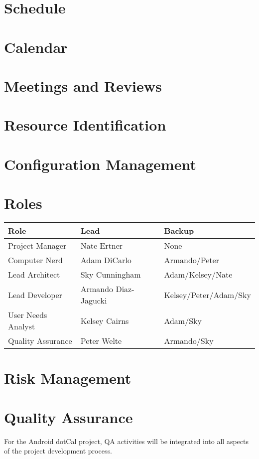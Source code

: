 \documentclass[11pt]{article}
\begin{document}
\section{Schedule}
\section{Calendar}
\section{Meetings and Reviews}
\section{Resource Identification}
\section{Configuration Management}
\section{Roles}

\begin{tabular}{|l|l|l|}
 \hline
\textbf{Role} & \textbf{Lead} & \textbf{Backup}  \\ \hline
Project Manager & Nate Ertner & None\\ \hline
Computer Nerd & Adam DiCarlo  & Armando/Peter\\ \hline
Lead Architect & Sky Cunningham  & Adam/Kelsey/Nate \\ \hline
Lead Developer & Armando Diaz-Jagucki & Kelsey/Peter/Adam/Sky \\ \hline
User Needs Analyst & Kelsey Cairns & Adam/Sky \\ \hline
Quality Assurance & Peter Welte  & Armando/Sky \\ \hline

\end{tabular}


\section{Risk Management}
\section{Quality Assurance}

For the Android dotCal project, QA activities will be integrated into all aspects of the project development process.
\end{document}
